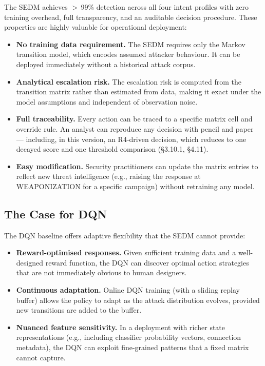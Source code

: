 The SEDM achieves $>$\,99\% detection across all four intent profiles with
zero training overhead, full transparency, and an auditable decision
procedure.
These properties are highly valuable for operational deployment:
%
\begin{itemize}
  \item \textbf{No training data requirement.}
        The SEDM requires only the Markov transition model, which encodes
        assumed attacker behaviour.
        It can be deployed immediately without a historical attack corpus.
  \item \textbf{Analytical escalation risk.}
        The escalation risk is computed from the transition matrix rather
        than estimated from data, making it exact under the model assumptions
        and independent of observation noise.
  \item \textbf{Full traceability.}
        Every action can be traced to a specific matrix cell and override
        rule.
        An analyst can reproduce any decision with pencil and paper ---
        including, in this version, an R4-driven decision, which reduces to
        one decayed score and one threshold comparison (\S3.10.1, \S4.11).
  \item \textbf{Easy modification.}
        Security practitioners can update the matrix entries to reflect new
        threat intelligence (e.g., raising the response at WEAPONIZATION
        for a specific campaign) without retraining any model.
\end{itemize}

\subsection{The Case for DQN}

The DQN baseline offers adaptive flexibility that the SEDM cannot provide:
%
\begin{itemize}
  \item \textbf{Reward-optimised responses.}
        Given sufficient training data and a well-designed reward function,
        the DQN can discover optimal action strategies that are not
        immediately obvious to human designers.
  \item \textbf{Continuous adaptation.}
        Online DQN training (with a sliding replay buffer) allows the policy
        to adapt as the attack distribution evolves, provided new transitions
        are added to the buffer.
  \item \textbf{Nuanced feature sensitivity.}
        In a deployment with richer state representations (e.g., including
        classifier probability vectors, connection metadata), the DQN can
        exploit fine-grained patterns that a fixed matrix cannot capture.
\end{itemize}

